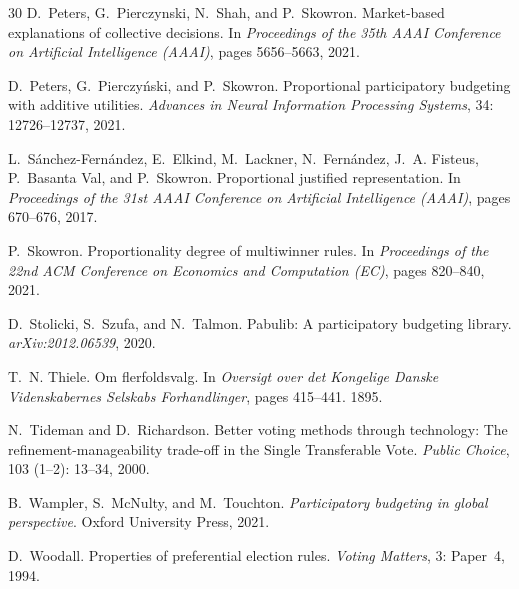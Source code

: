 \documentclass[10pt]{scrartcl}
\theoremstyle{definition}
\theoremstyle{plain}
\begin{document}
\begin{thebibliography}{30}
	D.~Peters, G.~Pierczynski, N.~Shah, and P.~Skowron.
	\newblock Market-based explanations of collective decisions.
	\newblock In \emph{Proceedings of the 35th AAAI Conference on Artificial
		Intelligence (AAAI)}, pages 5656--5663, 2021{}.
	
	D.~Peters, G.~Pierczy{\'n}ski, and P.~Skowron.
	\newblock Proportional participatory budgeting with additive utilities.
	\newblock \emph{Advances in Neural Information Processing Systems},
	34: 12726--12737, 2021{}.
	
	L.~S{\'a}nchez-Fern{\'a}ndez, E.~Elkind, M.~Lackner, N.~Fern{\'a}ndez, J.~A.
	Fisteus, P.~{Basanta Val}, and P.~Skowron.
	\newblock Proportional justified representation.
	\newblock In \emph{Proceedings of the 31st AAAI Conference on Artificial
		Intelligence (AAAI)}, pages 670--676, 2017.
	
	P.~Skowron.
	\newblock Proportionality degree of multiwinner rules.
	\newblock In \emph{Proceedings of the 22nd ACM Conference on Economics and
		Computation (EC)}, pages 820--840, 2021.
	
	D.~Stolicki, S.~Szufa, and N.~Talmon.
	\newblock Pabulib: A participatory budgeting library.
	\newblock \emph{arXiv:2012.06539}, 2020.
	
	T.~N. Thiele.
	\newblock Om flerfoldsvalg.
	\newblock In \emph{Oversigt over det Kongelige Danske Videnskabernes Selskabs
		Forhandlinger}, pages 415--441. 1895.
	
	N.~Tideman and D.~Richardson.
	\newblock Better voting methods through technology: {T}he
	refinement-manageability trade-off in the {S}ingle {T}ransferable {V}ote.
	\newblock \emph{Public Choice}, 103 (1--2): 13--34, 2000.
	
	B.~Wampler, S.~McNulty, and M.~Touchton.
	\newblock \emph{Participatory budgeting in global perspective}.
	\newblock Oxford University Press, 2021.
	
	D.~Woodall.
	\newblock Properties of preferential election rules.
	\newblock \emph{Voting Matters}, 3: Paper~4, 1994.
	
\end{thebibliography}
\end{document}
